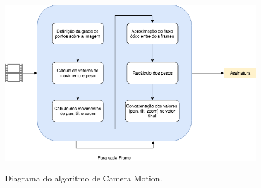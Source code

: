 \begin{figure}[h]
	\centering
	\caption{Diagrama do algoritmo de Camera Motion.}
	\includegraphics[width=\textwidth]{dados/figuras/diagramas/Diag-CameraMotion}
	\label{fig:dia_cameramotion}
\end{figure}








